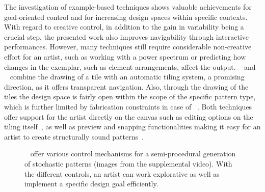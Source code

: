 The investigation of example-based techniques shows valuable achievements for goal-oriented control and for increasing design spaces within specific contexts. With regard to creative control, in addition to the gain in variability being a crucial step, the presented work also improves navigability through interactive performances. However, many techniques still require considerable non-creative effort for an artist, such as working with a power spectrum or predicting how changes in the exemplar, such as element arrangements, affect the output. \citeauthor*{tu_2020_cct}~\cite{tu_2020_cct} and \citeauthor*{bian_2018_tpd}~\cite{bian_2018_tpd} combine the drawing of a tile with an automatic tiling system, a promising direction, as it offers transparent navigation. Also, through the drawing of the tiles the design space is fairly open within the scope of the specific pattern type, which is further limited by fabrication constraints in case of \citeauthor*{bian_2018_tpd}~\cite{bian_2018_tpd}. Both techniques offer support for the artist directly on the canvas such as editing options on the tiling itself~\cite{tu_2020_cct}, as well as preview and snapping functionalities making it easy for an artist to create structurally sound patterns~\cite{bian_2018_tpd}. 

\begin{figure}[H]
    \centering
    \caption{\label{fig:guehl_2020_stu}\citeauthor*{guehl_2020_stu}~\cite{guehl_2020_stu} offer various control mechanisms for a semi-procedural generation of stochastic patterns (images from the supplemental video). With the different controls, an artist can work explorative as well as implement a specific design goal efficiently. }
\end{figure}

